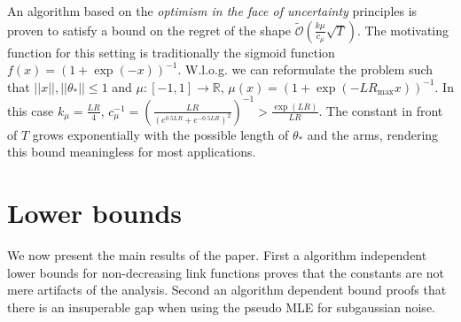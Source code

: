 \documentclass[twoside]{article} \usepackage{aistats2017}
\begin{document}
An algorithm based on the \textit{optimism in the face of uncertainty} principles is proven to satisfy a bound on the regret of the shape $\tilde{\mathcal{O}}(\frac{k\mu}{c_\mu}\sqrt{T})$. 
The motivating function for this setting is traditionally the sigmoid function $f(x) = (1+\exp(-x))^{-1}$.
W.l.o.g. we can reformulate the problem such that $||x||,||\theta_*||\leq 1$ and $\mu:[-1,1]\rightarrow\mathbb{R}$,
$\mu(x) = (1+\exp(-LR_{\max}x))^{-1}$.
In this case $k_\mu = \frac{LR}{4}$, $c_\mu^{-1} = \left(\frac{LR}{(e^{0.5LR}+e^{-0.5LR})^2}\right)^{-1} > \frac{\exp(LR)}{LR}$. The constant in front of $T$ grows exponentially with the possible length of $\theta_*$ and the arms, rendering this bound meaningless for most applications.


\section{Lower bounds} \label{lowerBounds}

We now present the main results of the paper. First a algorithm independent lower bounds for non-decreasing link functions proves that the constants are not mere artifacts of the analysis. Second an algorithm dependent bound proofs that there is an insuperable gap when using the pseudo MLE for subgaussian noise.
\end{document}
